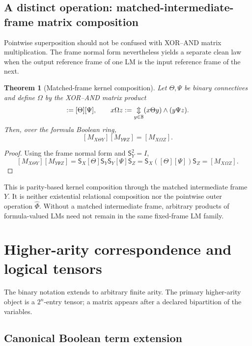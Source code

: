\documentclass[11pt]{article}
\newtheorem{theorem}{Theorem}[section]
\theoremstyle{definition}
\theoremstyle{remark}
\newcommand{\B}{\mathbb B}
\newcommand{\bigxor}{\mathop{\Updownarrow}\displaylimits}
\begin{document}
\subsection{A distinct operation: matched-intermediate-frame matrix composition}

Pointwise superposition should not be confused with XOR--AND matrix multiplication.  The frame normal form nevertheless yields a separate clean law when the output reference frame of one LM is the input reference frame of the next.

\begin{theorem}[Matched-frame kernel composition]
Let $\Theta,\Psi$ be binary connectives and define $\Omega$ by the XOR--AND matrix product
\begin{equation}
 [\Omega]:=[\Theta][\Psi],
 \qquad
 x\Omega z:=\bigxor_{y\in\B}(x\Theta y)\land(y\Psi z).
 \label{eq:matchedomega}
\end{equation}
Then, over the formula Boolean ring,
\begin{equation}
 \boxed{[M_{X\Theta Y}][M_{Y\Psi Z}]=[M_{X\Omega Z}].}
 \label{eq:matchedlmproduct}
\end{equation}
\end{theorem}
\begin{proof}
Using the frame normal form and $\mathsf S_Y^2=I$,
\[
 [M_{X\Theta Y}][M_{Y\Psi Z}]
 =\mathsf S_X[\Theta]\mathsf S_Y\mathsf S_Y[\Psi]\mathsf S_Z
 =\mathsf S_X([\Theta][\Psi])\mathsf S_Z
 =[M_{X\Omega Z}].
\]
\end{proof}

This is parity-based kernel composition through the matched intermediate frame $Y$.  It is neither existential relational composition nor the pointwise outer operation $\widehat\Phi$.  Without a matched intermediate frame, arbitrary products of formula-valued LMs need not remain in the same fixed-frame LM family.

\section{Higher-arity correspondence and logical tensors}
\label{sec:higher}

The binary notation extends to arbitrary finite arity.  The primary higher-arity object is a $2^n$-entry tensor; a matrix appears after a declared bipartition of the variables.

\subsection{Canonical Boolean term extension}
\end{document}
